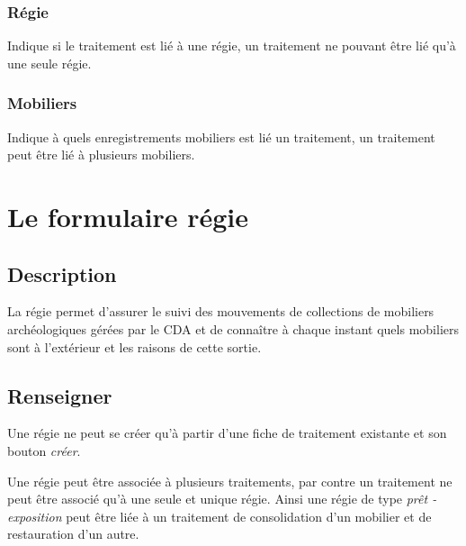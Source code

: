 \documentclass[letterpaper,10pt,french]{sphinxmanual}
\begin{document}
\subsection{Régie}
\label{manuel/formulaire_traitement:regie}
Indique si le traitement est lié à une régie, un traitement ne pouvant être lié qu'à une seule régie.


\subsection{Mobiliers}
\label{manuel/formulaire_traitement:mobiliers}
Indique à quels enregistrements mobiliers est lié un traitement, un traitement peut être lié à plusieurs mobiliers.


\chapter{Le formulaire régie}
\label{manuel/formulaire_regie::doc}\label{manuel/formulaire_regie:le-formulaire-regie}

\section{Description}
\label{manuel/formulaire_regie:description}
La régie permet d'assurer le suivi des mouvements de collections de mobiliers archéologiques gérées par le CDA et de connaître à chaque instant quels mobiliers sont à l'extérieur et les raisons de cette sortie.
\begin{figure}[htbp]
\centering

\end{figure}


\section{Renseigner}
\label{manuel/formulaire_regie:renseigner}
Une régie ne peut se créer qu'à partir d'une fiche de traitement existante et son bouton \emph{créer}.

Une régie peut être associée à plusieurs traitements, par contre un traitement ne peut être associé qu'à une seule et unique régie. Ainsi une régie de type \emph{prêt - exposition} peut être liée à un traitement de consolidation d'un mobilier et de restauration d'un autre.
\end{document}
